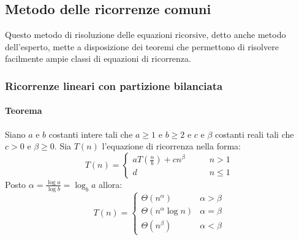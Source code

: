 \subsection{Metodo delle ricorrenze comuni}
Questo metodo di risoluzione delle equazioni ricorsive, detto anche metodo dell'esperto, mette a disposizione dei teoremi che permettono di risolvere 
facilmente ampie classi di equazioni di ricorrenza.
\subsubsection{Ricorrenze lineari con partizione bilanciata}
\paragraph{Teorema}
Siano $a$ e $b$ costanti intere tali che $a\ge 1$ e $b\ge 2$ e $c$ e $\beta$ costanti reali tali che $c>0$ e $\beta\ge 0$. Sia $T(n)$ l'equazione di 
ricorrenza nella forma:
\begin{equation*}
T(n)=
\begin{cases}
aT(\frac{n}{b})+cn^\beta\quad\quad & n>1\\
d & n\le 1
\end{cases}
\end{equation*}
Posto $\alpha=\frac{\log a}{\log b}=\log_b a$ allora:
\begin{equation*}
T(n)=
\begin{cases}
\Theta(n^\alpha) \quad\quad & \alpha>\beta\\ 
\Theta(n^\alpha\log n) & \alpha=\beta\\ 
\Theta(n^\beta) & \alpha<\beta
\end{cases}
\end{equation*}

